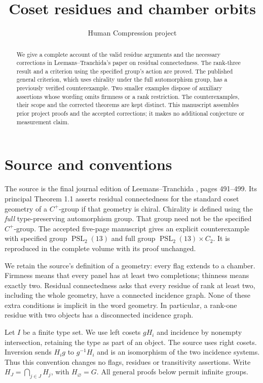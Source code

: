 \documentclass[11pt]{article}
\title{Coset residues and chamber orbits}
\author{Human Compression project}
\date{}
\begin{document}
\maketitle
\begin{abstract}
We give a complete account of the valid residue arguments and the
necessary corrections in Leemans--Tranchida's paper on residual
connectedness. The rank-three result and a criterion using the
specified group's action are proved. The published general criterion,
which uses chirality under the full automorphism group, has a previously
verified counterexample. Two smaller examples dispose of auxiliary
assertions whose wording omits firmness or a rank restriction. The
counterexamples, their scope and the corrected theorems are kept
distinct. This manuscript assembles prior project proofs and the
accepted corrections; it makes no additional conjecture or measurement
claim.
\end{abstract}

\section{Source and conventions}
The source is the final journal edition of Leemans--Tranchida
\cite{LT}, pages 491--499. Its principal Theorem 1.1 asserts residual
connectedness for the standard coset geometry of a $C^+$-group if that
geometry is chiral. Chirality is defined using the \emph{full}
type-preserving automorphism group. That group need not be the
specified $C^+$-group. The accepted five-page manuscript \cite{CE}
gives an explicit counterexample with specified group
$\operatorname{PSL}_2(13)$ and full group
$\operatorname{PSL}_2(13)\times C_2$. It is reproduced in the complete
volume with its proof unchanged.

We retain the source's definition of a geometry: every flag extends
to a chamber. Firmness means that every panel has at least two
completions; thinness means exactly two. Residual connectedness asks
that every residue of rank at least two, including the whole geometry,
have a connected incidence graph. None of these extra conditions is
implicit in the word geometry. In particular, a rank-one residue with
two objects has a disconnected incidence graph.

Let $I$ be a finite type set. We use left cosets $gH_i$ and incidence
by nonempty intersection, retaining the type as part of an object.
The source uses right cosets. Inversion sends $H_i g$ to $g^{-1}H_i$
and is an isomorphism of the two incidence systems. Thus this
convention changes no flags, residues or transitivity assertions.
Write $H_J=\bigcap_{j\in J}H_j$, with $H_\varnothing=G$.
All general proofs below permit infinite groups.
\end{document}
